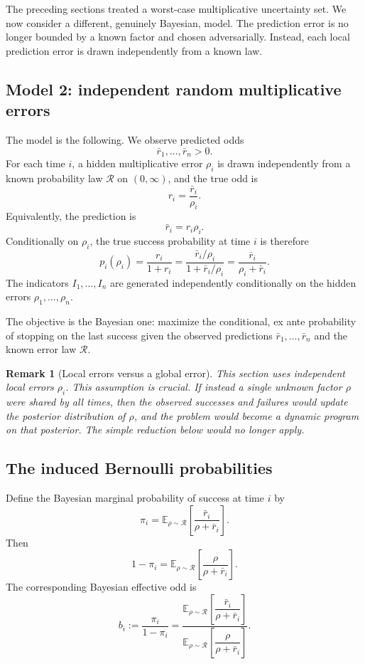 \documentclass[11pt,a4paper]{article}
\newtheorem{remark}{Remark}
\begin{document}
The preceding sections treated a worst-case multiplicative uncertainty set.  We
now consider a different, genuinely Bayesian, model.  The prediction error is no
longer bounded by a known factor and chosen adversarially.  Instead, each local
prediction error is drawn independently from a known law.

\subsection{Model 2: independent random multiplicative errors}

The model is the following.  We observe predicted odds
\[
  \bar r_1,\dots,\bar r_n>0.
\]
For each time $i$, a hidden multiplicative error $\rho_i$ is drawn independently
from a known probability law $\mathcal R$ on $(0,\infty)$, and the true odd is
\[
  \boxed{
  r_i=\frac{\bar r_i}{\rho_i}.
  }
  \tag{12}
\]
Equivalently, the prediction is
\[
  \bar r_i=r_i\rho_i.
\]
Conditionally on $\rho_i$, the true success probability at time $i$ is therefore
\[
  p_i(\rho_i)
  =\frac{r_i}{1+r_i}
  =\frac{\bar r_i/\rho_i}{1+\bar r_i/\rho_i}
  =\frac{\bar r_i}{\rho_i+\bar r_i}.
\]
The indicators $I_1,\dots,I_n$ are generated independently conditionally on the
hidden errors $\rho_1,
\dots,\rho_n$.

The objective is the Bayesian one: maximize the conditional, ex ante probability
of stopping on the last success given the observed predictions
$\bar r_1,
\dots,\bar r_n$ and the known error law $\mathcal R$.

\begin{remark}[Local errors versus a global error]
This section uses independent local errors $\rho_i$.  This assumption is crucial.
If instead a single unknown factor $\rho$ were shared by all times, then the
observed successes and failures would update the posterior distribution of
$\rho$, and the problem would become a dynamic program on that posterior.  The
simple reduction below would no longer apply.
\end{remark}

\subsection{The induced Bernoulli probabilities}

Define the Bayesian marginal probability of success at time $i$ by
\[
  \pi_i
  =\mathbb E_{\rho\sim\mathcal R}
  \left[
    \frac{\bar r_i}{\rho+\bar r_i}
  \right].
\]
Then
\[
  1-\pi_i
  =\mathbb E_{\rho\sim\mathcal R}
  \left[
    \frac{\rho}{\rho+\bar r_i}
  \right].
\]
The corresponding Bayesian effective odd is
\[
  \boxed{
  b_i
  :=\frac{\pi_i}{1-\pi_i}
  =
  \frac{
    \mathbb E_{\rho\sim\mathcal R}
    \left[\dfrac{\bar r_i}{\rho+\bar r_i}\right]
  }{
    \mathbb E_{\rho\sim\mathcal R}
    \left[\dfrac{\rho}{\rho+\bar r_i}\right]
  }.
  }
  \tag{13}
\]
\end{document}
